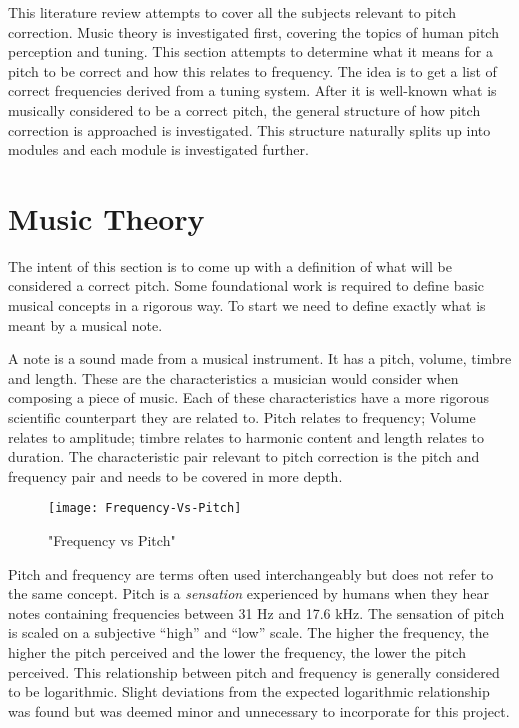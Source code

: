 
This literature review attempts to cover all the subjects relevant to pitch
correction. Music theory is investigated first, covering the topics of human pitch
perception and tuning. This section attempts to determine what it means for a
pitch to be correct and how this relates to frequency. The idea is to get a list
of correct frequencies derived from a tuning system. After it is well-known what
is musically considered to be a correct pitch, the general structure of how pitch
correction is approached is investigated. This structure naturally splits up into
modules and each module is investigated further.

\section{Music Theory}

The intent of this section is to come up with a definition of what will be
considered a correct pitch. Some foundational work is required to define basic
musical concepts in a rigorous way. To start we need to define exactly what is
meant by a musical note.

A note is a sound made from a musical instrument. It has a pitch, volume, timbre
and length. These are the characteristics a musician would consider when composing
a piece of music. Each of these characteristics have a more rigorous scientific
counterpart they are related to. Pitch relates to frequency; Volume relates to
amplitude; timbre relates to harmonic content and length relates to duration. The
characteristic pair relevant to pitch correction is the pitch and frequency pair
and needs to be covered in more depth.

\begin{wrapfigure}{L}{0.5\textwidth}
\texttt{[image: Frequency-Vs-Pitch]}
\caption{"Frequency vs Pitch"}
\label{fig:FrequencyVsPitch}
\end{wrapfigure}

Pitch and frequency are terms often used interchangeably but does not refer to the
same concept. Pitch is a \textit{sensation} experienced by humans when they hear
notes containing frequencies between 31 Hz and 17.6 kHz\cite{Hearing}. The
sensation of pitch is scaled on a subjective ``high'' and ``low'' scale. The
higher the frequency, the higher the pitch perceived and the lower the frequency,
the lower the pitch perceived. This relationship between pitch and frequency is
generally considered to be logarithmic. Slight deviations from the expected
logarithmic relationship was found\cite{PitchVsFrequency} but was deemed minor
and unnecessary to incorporate for this project.

